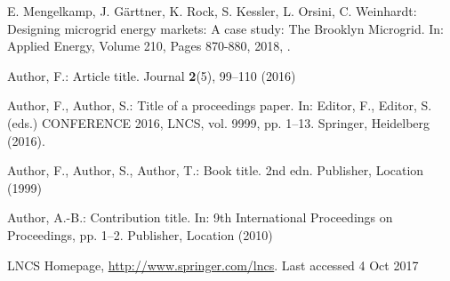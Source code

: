 \documentclass[runningheads]{llncs}
\begin{document}
\begin{thebibliography}{8}
E. Mengelkamp, J. Gärttner, K. Rock, S. Kessler, L. Orsini, C. Weinhardt: Designing microgrid energy markets: A case study: The Brooklyn Microgrid. In: Applied Energy, Volume 210, Pages 870-880, 2018, .

Author, F.: Article title. Journal \textbf{2}(5), 99--110 (2016)

Author, F., Author, S.: Title of a proceedings paper. In: Editor,
F., Editor, S. (eds.) CONFERENCE 2016, LNCS, vol. 9999, pp. 1--13.
Springer, Heidelberg (2016). 

Author, F., Author, S., Author, T.: Book title. 2nd edn. Publisher,
Location (1999)

Author, A.-B.: Contribution title. In: 9th International Proceedings
on Proceedings, pp. 1--2. Publisher, Location (2010)

LNCS Homepage, \url{http://www.springer.com/lncs}. Last accessed 4
Oct 2017
\end{thebibliography}
\end{document}
